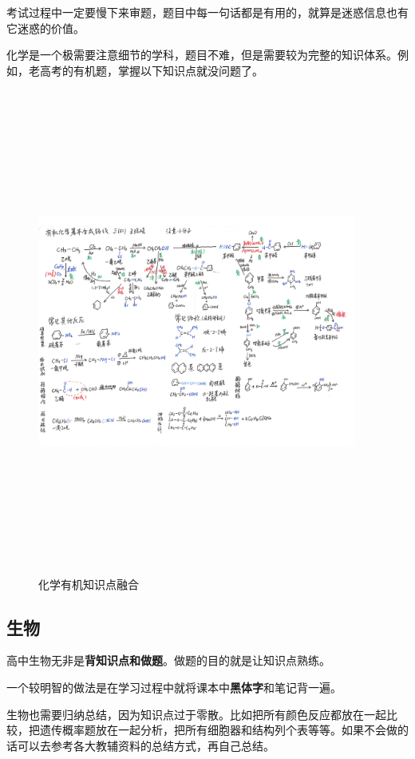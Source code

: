 \documentclass[UTF8,11pt,a4paper]{ctexart}
\begin{document}
			考试过程中一定要慢下来审题，题目中每一句话都是有用的，就算是迷惑信息也有它迷惑的价值。
			
			化学是一个极需要注意细节的学科，题目不难，但是需要较为完整的知识体系。例如，老高考的有机题，掌握以下知识点就没问题了。
			
			\begin{figure}[h]
				\centering
				\includegraphics[width=10.5cm,height=16cm,angle=270]{2020-09-08_001.jpg}
				
				\caption{化学有机知识点融合}
			\end{figure}
		\subsection{生物}
			高中生物无非是\textbf{背知识点和做题}。做题的目的就是让知识点熟练。
			
			一个较明智的做法是在学习过程中就将课本中\textbf{黑体字}和笔记背一遍。
			
			生物也需要归纳总结，因为知识点过于零散。比如把所有颜色反应都放在一起比较，把遗传概率题放在一起分析，把所有细胞器和结构列个表等等。如果不会做的话可以去参考各大教辅资料的总结方式，再自己总结。
\end{document}
